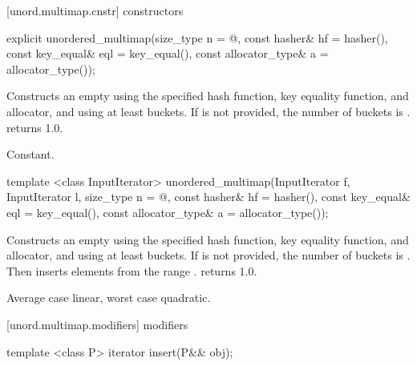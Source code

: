 [unord.multimap.cnstr]{ constructors}

%
\begin{itemdecl}
explicit unordered_multimap(size_type n = @\seebelow@,
                            const hasher& hf = hasher(),
                            const key_equal& eql = key_equal(),
                            const allocator_type& a = allocator_type());
\end{itemdecl}

\begin{itemdescr}
\pnum
\effects Constructs an empty  using the
specified hash function, key equality function, and allocator, and
using at least \textit{} buckets.  If \textit{} is not
provided, the number of buckets is .
 returns 1.0.

\pnum
\complexity Constant.
\end{itemdescr}

%
\begin{itemdecl}
template <class InputIterator>
  unordered_multimap(InputIterator f, InputIterator l,
                     size_type n = @\seebelow@,
                     const hasher& hf = hasher(),
                     const key_equal& eql = key_equal(),
                     const allocator_type& a = allocator_type());
\end{itemdecl}

\begin{itemdescr}
\pnum
\effects Constructs an empty  using the
specified hash function, key equality function, and allocator, and
using at least \textit{} buckets. If \textit{} is not
provided, the number of buckets is . Then
inserts elements from the range \tcode{[\textit{f}, \textit{l})}.
 returns 1.0.

\pnum
\complexity Average case linear, worst case quadratic.
\end{itemdescr}

[unord.multimap.modifiers]{ modifiers}

%
%
\begin{itemdecl}
template <class P>
  iterator insert(P&& obj);
\end{itemdecl}

